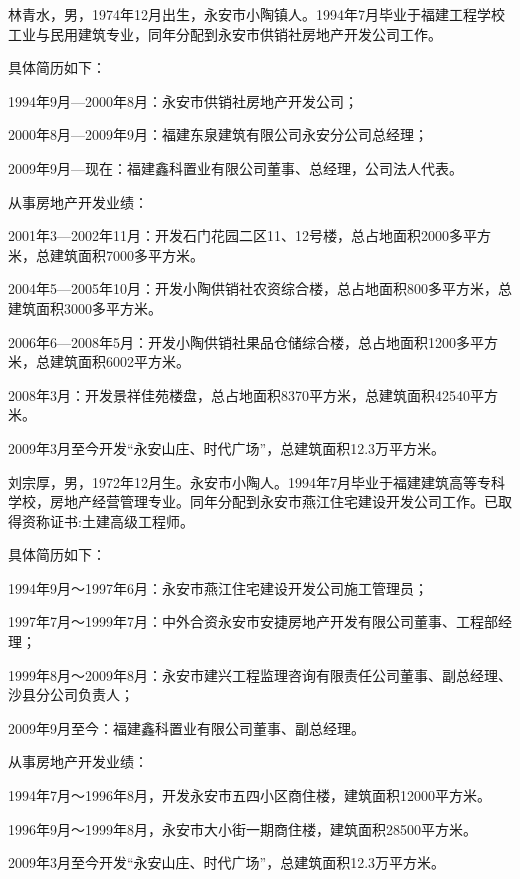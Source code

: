 \begin{mdfbox}[林青水]
林青水，男，1974年12月出生，永安市小陶镇人。1994年7月毕业于福建工程学校工业与民用建筑专业，同年分配到永安市供销社房地产开发公司工作。

具体简历如下：
\begin{compactitem}
\item 1994年9月—2000年8月：永安市供销社房地产开发公司；
\item 2000年8月—2009年9月：福建东泉建筑有限公司永安分公司总经理；
\item 2009年9月—现在：福建鑫科置业有限公司董事、总经理，公司法人代表。
\end{compactitem}

从事房地产开发业绩：
\begin{compactenum}
\item 2001年3—2002年11月：开发石门花园二区11、12号楼，总占地面积2000多平方米，总建筑面积7000多平方米。
\item 2004年5—2005年10月：开发小陶供销社农资综合楼，总占地面积800多平方米，总建筑面积3000多平方米。
\item 2006年6—2008年5月：开发小陶供销社果品仓储综合楼，总占地面积1200多平方米，总建筑面积6002平方米。
\item 2008年3月：开发景祥佳苑楼盘，总占地面积8370平方米，总建筑面积42540平方米。
\item 2009年3月至今开发“永安山庄、时代广场”，总建筑面积12.3万平方米。
\end{compactenum}
\end{mdfbox}
\begin{mdfbox}[刘宗厚]
刘宗厚，男，1972年12月生。永安市小陶人。1994年7月毕业于福建建筑高等专科学校，房地产经营管理专业。同年分配到永安市燕江住宅建设开发公司工作。已取得资称证书:土建高级工程师。

具体简历如下：
\begin{compactitem}
\item 1994年9月～1997年6月：永安市燕江住宅建设开发公司施工管理员；
\item 1997年7月～1999年7月：中外合资永安市安捷房地产开发有限公司董事、工程部经理；
\item 1999年8月～2009年8月：永安市建兴工程监理咨询有限责任公司董事、副总经理、沙县分公司负责人；
\item 2009年9月至今：福建鑫科置业有限公司董事、副总经理。
\end{compactitem}

从事房地产开发业绩：
\begin{compactenum}
\item 1994年7月～1996年8月，开发永安市五四小区商住楼，建筑面积12000平方米。
\item 1996年9月～1999年8月，永安市大小街一期商住楼，建筑面积28500平方米。
\item 2009年3月至今开发“永安山庄、时代广场”，总建筑面积12.3万平方米。
\end{compactenum}
\end{mdfbox}
